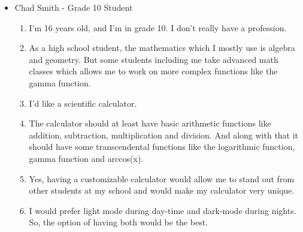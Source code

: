 \documentclass[titlepage]{article}
\begin{document}
\begin{itemize}
                    \item Chad Smith - Grade 10 Student
                        \begin{enumerate}
                            \item I'm 16 years old, and I'm in grade 10. I don't really have a profession.
                            \item As a high school student, the mathematics which I mostly use is algebra and geometry. But some students including me take advanced math classes which allows me to work on more complex functions like the gamma function.
                            \item I’d like a scientific calculator.
                            \item The calculator should at least have basic arithmetic functions like addition, subtraction, multiplication and division. And along with that it should have some transcendental functions like the logarithmic function, gamma function and arccos(x).
                            \item Yes, having a customizable calculator would allow me to stand out from other students at my school and would make my calculator very unique.
                            \item I would prefer light mode during day-time and dark-mode during nights. So, the option of having both would be the best.

\end{enumerate}
\end{itemize}
\end{document}
